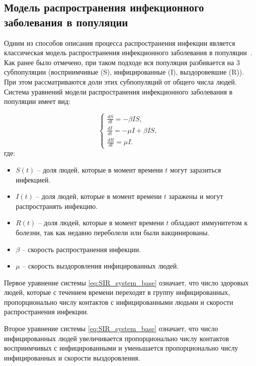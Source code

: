 \documentclass[14pt,a4paper]{article}
\begin{document}
\subsection{Модель распространения инфекционного заболевания в популяции}

Одним из способов описания процесса распространения инфекции является классическая модель распространения инфекционного заболевания в популяции~\cite{Murray}. Как ранее было отмечено, при таком подходе вся популяция разбивается на 3 субпопуляции (восприимчивые (S), инфицированные (I), выздоровевшие (R)). При этом рассматриваются доли этих субпопуляций от общего числа людей. Система уравнений модели распространения инфекционного заболевания в популяции имеет вид:

\begin{equation}
	\begin{cases}
		\frac{d S}{d t} = -\beta  I S, \\
		\frac{d I}{d t} = -\mu I + \beta  I S, \\
		\frac{d R}{d t} = \mu I .
	\end{cases}
	\label{eq:SIR_system_base}
\end{equation}
где:
\begin{itemize}
	
	\item $S(t)$ -- доля людей, которые в момент времени $t$ могут заразиться инфекцией.
	
	\item  $I(t)$ -- доля людей, которые в момент времени $t$ заражены и могут распространять инфекцию.
	
	\item $R(t)$ -- доля людей, которые в момент времени $t$ обладают иммунитетом к болезни, так как недавно переболели или были вакцинированы.
	
	\item $\beta$ -- скорость распространения инфекции.	
	
	\item $\mu$ -- скорость выздоровления инфицированных людей.
	
	
\end{itemize}

Первое уравнение системы \eqref{eq:SIR_system_base} означает, что число здоровых людей, которые с течением времени переходят в группу инфицированных, пропорционально числу контактов с инфицированными людьми и скорости распространения инфекции. 

Второе уравнение системы \eqref{eq:SIR_system_base} означает, что число инфицированных людей увеличивается пропорционально числу контактов восприимчивых с инфицированными и уменьшается пропорционально числу инфицированных и скорости выздоровления.
 	
\end{document}
